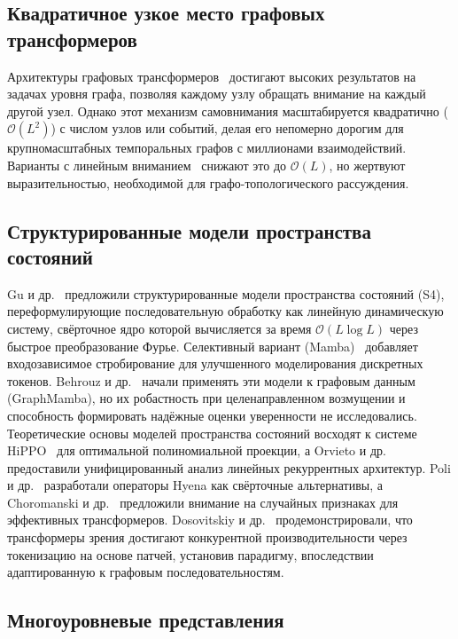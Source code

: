 \subsection{Квадратичное узкое место графовых трансформеров}

Архитектуры графовых трансформеров~\cite{Vaswani2017,Ying2021} достигают высоких результатов на задачах уровня графа, позволяя каждому узлу обращать внимание на каждый другой узел. Однако этот механизм самовнимания масштабируется квадратично ($\mathcal{O}(L^2)$) с числом узлов или событий, делая его непомерно дорогим для крупномасштабных темпоральных графов с миллионами взаимодействий. Варианты с линейным вниманием~\cite{Katharopoulos2020} снижают это до $\mathcal{O}(L)$, но жертвуют выразительностью, необходимой для графо-топологического рассуждения.


\subsection{Структурированные модели пространства состояний}

Gu и др.~\cite{Gu2022} предложили структурированные модели пространства состояний (S4), переформулирующие последовательную обработку как линейную динамическую систему, свёрточное ядро которой вычисляется за время $\mathcal{O}(L\log L)$ через быстрое преобразование Фурье. Селективный вариант (Mamba)~\cite{Dao2024} добавляет входозависимое стробирование для улучшенного моделирования дискретных токенов. Behrouz и др.~\cite{Behrouz2024graphmamba} начали применять эти модели к графовым данным (GraphMamba), но их робастность при целенаправленном возмущении и способность формировать надёжные оценки уверенности не исследовались. Теоретические основы моделей пространства состояний восходят к системе HiPPO~\cite{Gu2020hippo} для оптимальной полиномиальной проекции, а Orvieto и др.~\cite{Orvieto2023} предоставили унифицированный анализ линейных рекуррентных архитектур. Poli и др.~\cite{Poli2023} разработали операторы Hyena как свёрточные альтернативы, а Choromanski и др.~\cite{Choromanski2021,Perez2021} предложили внимание на случайных признаках для эффективных трансформеров. Dosovitskiy и др.~\cite{Dosovitskiy2021,Salvi2024} продемонстрировали, что трансформеры зрения достигают конкурентной производительности через токенизацию на основе патчей, установив парадигму, впоследствии адаптированную к графовым последовательностям.


\subsection{Многоуровневые представления}

